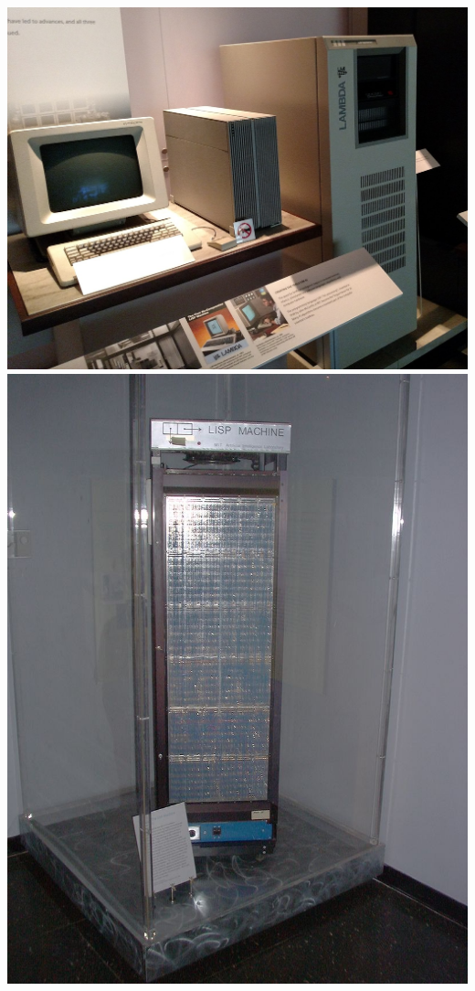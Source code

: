 \documentclass{beamer}
\begin{document}
\begin{frame}
	\includegraphics[scale=0.08]{bilder/lispm1.jpg}
	  \includegraphics[scale=0.3]{bilder/lispm.jpg}

\end{frame}
\end{document}
